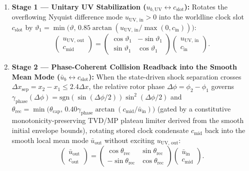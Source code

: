 \documentclass[11pt,a4paper]{article}
\theoremstyle{definition}
\begin{document}
\begin{enumerate}
\item \textbf{Stage 1 --- Unitary UV Stabilization ($u_{b,\text{UV}} \leftrightarrow c_{\text{slot}}$):} Rotates the overflowing Nyquist difference mode $u_{\text{UV, in}} > 0$ into the worldline clock slot $c_{\text{slot}}$ by $\vartheta_1 = \min\!\big(\vartheta, \, 0.85 \arctan(u_{\text{UV, in}} / \max(0, c_{\text{in}}))\big)$:
\begin{equation}
\begin{pmatrix} u_{\text{UV, out}} \\ c_{\text{mid}} \end{pmatrix} = \begin{pmatrix} \cos\vartheta_1 & -\sin\vartheta_1 \\ \sin\vartheta_1 & \cos\vartheta_1 \end{pmatrix} \begin{pmatrix} u_{\text{UV, in}} \\ c_{\text{in}} \end{pmatrix}.
\end{equation}
\item \textbf{Stage 2 --- Phase-Coherent Collision Readback into the Smooth Mean Mode ($\bar{u}_b \leftrightarrow c_{\text{slot}}$):} When the state-driven shock separation crosses $\Delta x_{\text{sep}} = x_2 - x_1 \le 2.4 \Delta x$, the relative rotor phase $\Delta\phi = \phi_2 - \phi_1$ governs $\gamma_{\text{phase}}(\Delta\phi) = \mathrm{sgn}(\sin(\Delta\phi/2)) \sin^2(\Delta\phi/2)$ and $\theta_{\text{rec}} = \min\!\big(\theta_{\text{cap}}, \, 0.40 \gamma_{\text{phase}} \arctan(c_{\text{mid}} / \bar{u}_{\text{in}})\big)$ (gated by a constitutive monotonicity-preserving TVD/MP plateau limiter derived from the smooth initial envelope bounds), rotating stored clock condensate $c_{\text{mid}}$ back into the smooth local mean mode $\bar{u}_{\text{out}}$ without exciting $u_{\text{UV, out}}$:
\begin{equation}
\begin{pmatrix} \bar{u}_{\text{out}} \\ c_{\text{out}} \end{pmatrix} = \begin{pmatrix} \cos\theta_{\text{rec}} & \sin\theta_{\text{rec}} \\ -\sin\theta_{\text{rec}} & \cos\theta_{\text{rec}} \end{pmatrix} \begin{pmatrix} \bar{u}_{\text{in}} \\ c_{\text{mid}} \end{pmatrix}.

\end{equation}
\end{enumerate}
\end{document}
